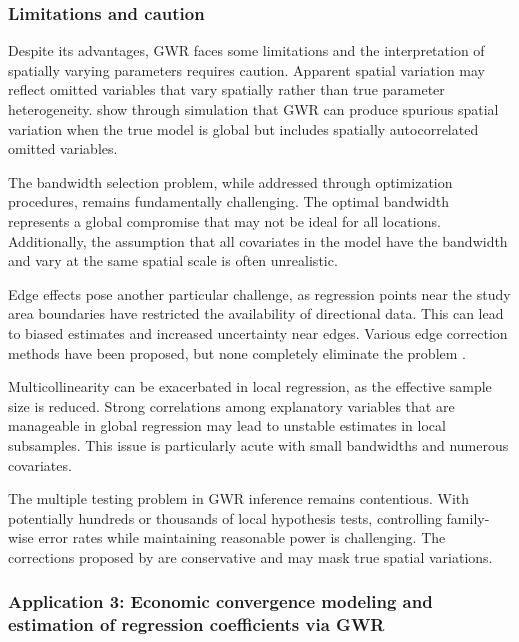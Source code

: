 \documentclass[smallextended, natbib]{svjour3}       %
\begin{document}
\subsubsection*{Limitations and caution}

Despite its advantages, GWR faces some limitations and the interpretation of spatially varying parameters requires caution. 
Apparent spatial variation may reflect omitted variables that vary spatially rather than true parameter heterogeneity. 
\cite{paez2011simulation} show through simulation that GWR can produce spurious spatial variation when the true model is global but includes spatially autocorrelated omitted variables.

The bandwidth selection problem, while addressed through optimization procedures, remains fundamentally challenging. 
The optimal bandwidth represents a global compromise that may not be ideal for all locations.
Additionally, the assumption that all covariates in the model have the bandwidth and vary at the same spatial scale is often unrealistic.

Edge effects pose another particular challenge, as regression points near the study area boundaries have restricted the availability of directional data.
This can lead to biased estimates and increased uncertainty near edges. 
Various edge correction methods have been proposed, but none completely eliminate the problem \citep{lu2014geographically}.

Multicollinearity can be exacerbated in local regression, as the effective sample size is reduced. 
Strong correlations among explanatory variables that are manageable in global regression may lead to unstable estimates in local subsamples. 
This issue is particularly acute with small bandwidths and numerous covariates.

The multiple testing problem in GWR inference remains contentious. 
With potentially hundreds or thousands of local hypothesis tests, controlling family-wise error rates while maintaining reasonable power is challenging. 
The corrections proposed by \cite{DaSilva2016} are conservative and may mask true spatial variations.

\subsubsection{Application 3: Economic convergence modeling and  estimation of regression coefficients via GWR}
\end{document}
